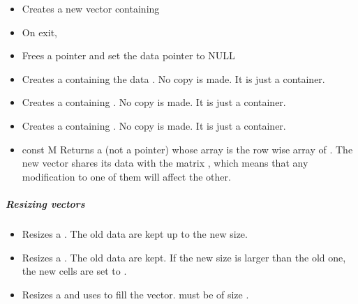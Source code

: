 \begin{itemize}
\item {}
  \sshortdescribe Creates a new vector containing 
\item {}
  \sshortdescribe On exit, 

\item {}
  \sshortdescribe Frees a  pointer and set the data pointer to NULL  
\item {}
    \sshortdescribe Creates a  containing the data 
  . No copy is made. It is just a container.
  
\item {}
  \sshortdescribe Creates a  containing . No
  copy is made. It is just a container.

\item {}
  \sshortdescribe Creates a  containing . No
  copy is made. It is just a container.

\item {}
  {const  \ptr M}
  \sshortdescribe Returns a  (not a pointer) whose array is
  the row wise array of . The new vector shares its data with the
  matrix , which means that any modification to one of them will affect
  the other.
\end{itemize}

\subparagraph{Resizing vectors}
\begin{itemize}
\item {}
  \sshortdescribe Resizes a . The old data are kept up to
  the new size.
\item {} 
  \sshortdescribe Resizes a .  The old data are kept. If
  the new size is larger than the old one, the new cells are set to .
\item {} 
  \sshortdescribe Resizes a  and uses  to fill the
  vector.  must be of size .
\end{itemize}  

